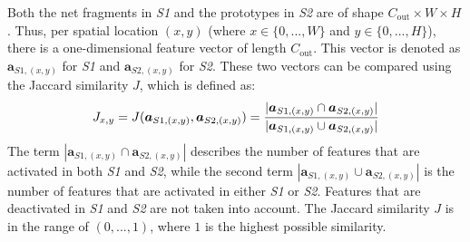 Both the net fragments in \emph{S1} and the prototypes in \emph{S2} are of shape $C_{\text{out}} \times W \times H$. Thus, per spatial location $(x,y)$ (where $x \in \{0, ..., W\}$ and $y \in \{0, ..., H\}$), there is a one-dimensional feature vector of length $C_{\text{out}}$. This vector is denoted as $\boldsymbol{a}_{S1,(x,y)}$ for \emph{S1} and $\boldsymbol{a}_{S2,(x,y)}$ for \emph{S2}.
These two vectors can be compared using the Jaccard similarity $J$, which is defined as:
%
\begin{align}\eqlbl{jaccard}
	J_{x,y} = J(\boldsymbol{a}_{S1,(x,y)}, \boldsymbol{a}_{S2,(x,y)}) = \frac{|\boldsymbol{a}_{S1,(x,y)} \cap \boldsymbol{a}_{S2,(x,y)}|}{|\boldsymbol{a}_{S1,(x,y)} \cup \boldsymbol{a}_{S2,(x,y)}|}
\end{align}
%
The term $|\boldsymbol{a}_{S1,(x,y)} \cap \boldsymbol{a}_{S2,(x,y)}|$ describes the number of features that are activated in both \emph{S1} and \emph{S2}, while the second term $|\boldsymbol{a}_{S1,(x,y)} \cup \boldsymbol{a}_{S2,(x,y)}|$ is the number of features that are activated in either \emph{S1} or \emph{S2}. Features that are deactivated in \emph{S1} and \emph{S2} are not taken into account.
The Jaccard similarity $J$ is in the range of $(0, ..., 1)$, where $1$ is the highest possible similarity.

